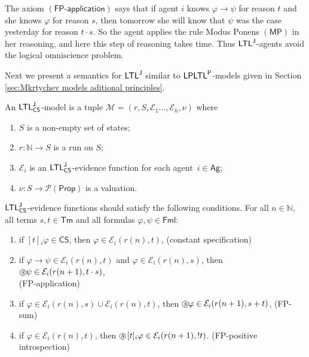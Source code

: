 \documentclass[envcountsect,envcountsame,oribibl,orivec]{llncs}
\newcommand*\circled[1]{\tikz[baseline=(char.base)]{
		\node[shape=circle,draw,inner sep=0.4pt] (char) {#1};}}
\newcommand{\Prop}{\textsf{Prop}}
\newcommand{\Formulae}{\textsf{Fml}}
\newcommand{\mprule}{\ensuremath{(\textsf{MP})}}
\newcommand{\limplies}{\rightarrow}
\newcommand{\sprevious}{\circled{\textit{s}}}
\newcommand{\LPLTLp}{\textsf{LPLTL}^{\sf P}}
\newcommand{\JLTL}{\textsf{LTL}^{\sf J}}
\newcommand{\Terms}{\textsf{Tm}}
\newcommand{\Ag}{\textsf{Ag}}
\newcommand{\jbox}[1]{\left[#1\right]\!}
\newcommand{\tapp}{\cdot}
\newcommand{\tinspect}{!}
\newcommand{\fpappax}{\ensuremath{(\textsf{FP-application})}}
\newcommand{\CS}{\textsf{CS}}
\newcommand{\numberofagents}{h}
\newcommand{\agent}{i}
\newcommand{\evidence}{\mathcal{E}}
\newcommand{\valuation}{\nu}
\newcommand{\M}{\mathcal{M}}
\newcommand{\N}{\mathbb{N}}
\renewcommand{\phi}{\varphi}
\begin{document}
The axiom $\fpappax$ says that if  agent $i$ knows $\phi \limplies \psi$ for reason $t$ and she knows $\phi$ for reason $s$, then tomorrow she will know that  $\psi$ was the case yesterday for reason $t \tapp s$. So the agent applies the rule Modus Ponens $\mprule$ in her reasoning, and here this step of reasoning takes time. Thus $\JLTL$-agents avoid the logical omniscience problem.




Next we present a semantics for $\JLTL$ similar to $\LPLTLp$-models given in Section \ref{sec:Mkrtychev models aditional principles}.

\begin{definition}\label{def: LTLJ-models}
	An  $\JLTL_\CS$-model is a tuple $\M = (r, S, \evidence_1\ldots,\evidence_\numberofagents, \valuation)$
	where
	\begin{enumerate}
		\item $S$ is a non-empty set of states;
		\item $r : \N \to S$ is a run on $S$;
		\item $\evidence_\agent$ is an $\JLTL_\CS$-evidence function for each agent~$\agent \in \Ag$;
		\item $\valuation: S \to \mathcal{P}(\Prop)$ is a valuation.
	\end{enumerate}	
	$\JLTL_\CS$-evidence functions should
	satisfy the following conditions.
	For all $n \in \N$, all terms $s,t \in \Terms$ and all formulas $\phi,\psi \in \Formulae$: 
	\begin{enumerate}
		\item 
		if $\jbox{t}_\agent \phi \in \CS$, then $\phi \in \evidence_\agent(r(n),t)$, \hfill (constant specification)
		
		\item 
		if $\phi \limplies \psi \in \evidence_\agent(r(n),t)$ and $\phi \in \evidence_\agent(r(n),s)$, then $\sprevious\psi \in \evidence_\agent(r(n+1), t \tapp s)$, \\ \text{} \hfill {\sf (FP-application)}
		\item 
		if $\phi \in \evidence_\agent(r(n),s) \cup \evidence_\agent(r(n),t)$, then $\sprevious \phi \in \evidence_\agent(r(n+1),s + t)$, \hfill {\sf (FP-sum)}
		\item 
		if $\phi \in \evidence_\agent(r(n),t)$, then $\sprevious\jbox{t}_\agent \phi \in \evidence_\agent(r(n+1),\tinspect t)$. \hfill {\sf (FP-positive introspection)}
	\end{enumerate}
\end{definition}
%
\end{document}
